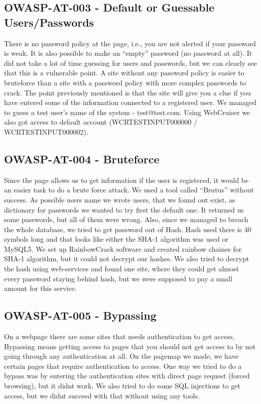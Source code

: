 \subsection{OWASP-AT-003 - Default or Guessable Users/Passwords}There is no password policy at the page, i.e., you are not alerted if your password is weak. It is also possible to make an “empty” password (no password at all). It did not take a lot of time guessing for users and passwords, but we can clearly see that this is a vulnerable point. A site without any password policy is easier to bruteforce than a site with a password policy with more complex passwords to crack.
The point previously mentioned is that the site will give you a clue if you have entered some of the information connected to a registered user. We managed to guess a test user’s name of the system - test@test.com. Using WebCruiser we also got access to default account (WCRTESTINPUT000000 / WCRTESTINPUT000002).

\subsection{OWASP-AT-004 - Bruteforce}Since the page allows us to get information if the user is registered, it would be an easier task to do a brute force attack. We used a tool called “Brutus” without success. As possible users name we wrote users, that we found out exist, as dictionary for passwords we wanted to try first the default one. It returned us some passwords, but all of them were wrong.
Also, since we managed to breach the whole database, we tried to get password out of Hash. Hash used there is 40 symbols long and that looks like either the SHA-1 algorithm was used or MySQL5. We set up RainbowCrack software and created rainbow chaines for SHA-1 algorithm, but it could not decrypt our hashes. We also tried to decrypt the hash using web-services and found one site, where they could get almost every password staying behind hash, but we were supposed to pay a small amount for this service. 

\subsection{OWASP-AT-005 - Bypassing}
On a webpage there are some sites that needs authentication to get access. Bypassing means getting access to pages that you should not get access to by not going through any authentication at all.
On the pagemap we made, we have certain pages that require authentication to access. One way we tried to do a bypass was by entering the authentication sites with direct page request (forced browsing), but it didnt work. We also tried to do some SQL injections to get access, but we didnt succeed with that without using any tools. 

